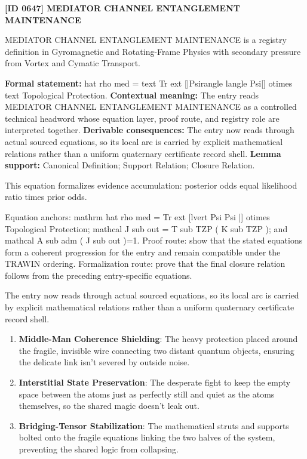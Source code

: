 \clearpage
\noindent\textbf{[ID 0647] MEDIATOR CHANNEL ENTANGLEMENT MAINTENANCE}\par
\vspace{0.35em}
\begingroup\small
{}
MEDIATOR CHANNEL ENTANGLEMENT MAINTENANCE is a registry definition in Gyromagnetic and Rotating-Frame Physics with secondary pressure from Vortex and Cymatic Transport.

\begingroup\footnotesize\setlength{\emergencystretch}{3em}\sloppy
\textbf{Formal statement:} hat rho med = text Tr ext [|Psirangle langle Psi|] otimes text Topological Protection. \textbf{Contextual meaning:} The entry reads MEDIATOR CHANNEL ENTANGLEMENT MAINTENANCE as a controlled technical headword whose equation layer, proof route, and registry role are interpreted together. \textbf{Derivable consequences:} The entry now reads through actual sourced equations, so its local arc is carried by explicit mathematical relations rather than a uniform quaternary certificate record shell. \textbf{Lemma support:} Canonical Definition; Support Relation; Closure Relation.\par
\endgroup

This equation formalizes evidence accumulation: posterior odds equal likelihood ratio times prior odds.

Equation anchors: mathrm hat rho med = Tr ext [lvert Psi Psi |] otimes Topological Protection; mathcal J sub out = T sub TZP ( K sub TZP ); and mathcal A sub adm ( J sub out )=1. Proof route: show that the stated equations form a coherent progression for the entry and remain compatible under the TRAWIN ordering. Formalization route: prove that the final closure relation follows from the preceding entry-specific equations.

The entry now reads through actual sourced equations, so its local arc is carried by explicit mathematical relations rather than a uniform quaternary certificate record shell.
\endgroup

\begin{enumerate}[leftmargin=1.6em,itemsep=6pt,topsep=4pt]
\item \textbf{Middle-Man Coherence Shielding}: The heavy protection placed around the fragile, invisible wire connecting two distant quantum objects, ensuring the delicate link isn't severed by outside noise.
\item \textbf{Interstitial State Preservation}: The desperate fight to keep the empty space between the atoms just as perfectly still and quiet as the atoms themselves, so the shared magic doesn't leak out.
\item \textbf{Bridging-Tensor Stabilization}: The mathematical struts and supports bolted onto the fragile equations linking the two halves of the system, preventing the shared logic from collapsing.
\end{enumerate}

